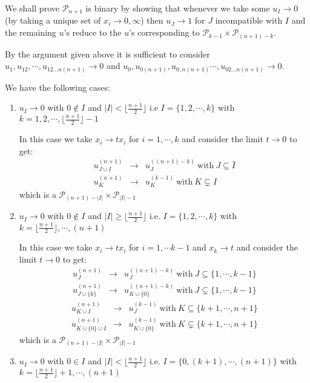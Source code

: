 \documentclass[hidelinks,12pt]{article}
\newcommand{\bea}[1]{\begin{eqnarray}\label{#1} }
\newcommand{\eea}{\end{eqnarray}}
\def\bea{\begin{eqnarray}}
\def\eea{\end{eqnarray}}
\begin{document}
\begin{enumerate}
We shall prove $\mathscr P_{n+1}$ is binary by showing that whenever we take some $u_I \rightarrow 0$ (by taking a unique set of $x_i \rightarrow 0, \infty$) then $u_J \rightarrow 1$ for $J$ incompatible with $I$ and the remaining $u$'s reduce to the $u$'s corresponding to $\mathscr P_{k-1} \times \mathscr P_{(n+1)-k}$. 

By the argument given above it is sufficient to consider $u_1, u_{12},\cdots,u_{12...n(n+1)} \rightarrow 0$ and $u_0, u_{0(n+1)},u_{0,n(n+1)}\cdots,u_{02...n(n+1)} \rightarrow 0$.

We have the following cases:
\begin{enumerate}
    \item $u_I \rightarrow 0$ with $0\notin I$ and $|I| < \lfloor \frac{n+1}{2} \rfloor$ i.e $I =  \{1,2,\cdots, k \}$ with $k= 1,2,\cdots, \lfloor \frac{n+1}{2} \rfloor -1$
    
    In this case we take $x_i \rightarrow t x_i$ for $i=1,\cdots, k $ and consider the limit $t \rightarrow 0$ to get:
    \bea
    u^{(n+1)}_{J \cup  I} &\rightarrow& u_{J}^{((n+1)-k )} ~\text{with}~ J\subseteq\bar{I}\\
     u^{(n+1)}_{K} &\rightarrow& u_{K}^{(k-1)} ~\text{with}~ K\subsetneq I
    \eea
   which is a $\mathscr P_{(n+1)-|I|} \times \mathscr P_{|I|-1}$ 
    
    
    \item $u_I \rightarrow 0$ with $0\notin I$ and $|I| \ge \lfloor \frac{n+1}{2} \rfloor$ i.e. $I = \{1,2,\cdots,k \}$ with $k= \lfloor \frac{n+1}{2} \rfloor,\cdots,(n+1)$
    
     In this case we take $x_i \rightarrow t x_i$ for $i=1,\cdots k-1$ and $x_{k} \rightarrow t$ and  consider the limit $t \rightarrow 0$ to get:
    \bea
    u^{(n+1)}_{J } &\rightarrow& u_{J}^{((n+1)-k)} ~\text{with}~ J\subseteq \{1,\cdots,k-1\}\\
     u^{(n+1)}_{J \cup \{k\}} &\rightarrow& u_{K \cup\{0\}}^{((n+1)-k)} ~\text{with}~ J\subsetneq \{1,\cdots,k-1\}
    \eea
     \bea
    u^{(n+1)}_{K \cup I } &\rightarrow& u_{J}^{(k-1)} ~\text{with}~ K\subseteq \{k +1,\cdots,n+1\}\\
     u^{(n+1)}_{K \cup \{0\}\cup I} &\rightarrow& u_{K \cup\{0\}}^{(k-1)} ~\text{with}~ K\subsetneq \{k +1,\cdots,n+1\}
    \eea
   which is a $\mathscr P_{(n+1)-|I|} \times \mathscr P_{|I|-1}$ 
    \item $u_I \rightarrow 0$ with $0\in I$ and $|I| < \lfloor \frac{n+1}{2} \rfloor$ i.e. $I = \{0,(k+1),\cdots,(n+1)\}$ with $k= \lfloor \frac{n+1}{2} \rfloor+1,\cdots,(n+1)$
    

\end{enumerate}
\end{enumerate}
\end{document}
